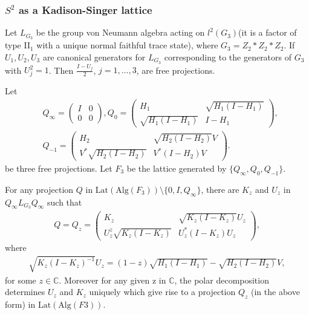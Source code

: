 \documentclass{beamer}
\newcommand{\Lat}{\mathrm{Lat}}
\newcommand{\Alg}{\mathrm{Alg}}
\newcommand{\C}{\mathbb C }
\begin{document}
\begin{frame}
\frametitle{$S^{2}$ as a Kadison-Singer lattice}

Let $L_{G_3}$ be the group von Neumann algebra acting on $l^2(G_3)$(it is
a factor of type II$_1$ with a unique normal faithful trace state),
where $G_3 = Z_2 * Z_2 * Z_2$. If $U_1, U_2, U_3$ are canonical generators
for $L_{G_3}$ corresponding to the generators of $G_3$ with $U_{j}^{2} = 1$.
Then $\frac{I-U_j}{2}$, $j = 1, \ldots, 3$, are free projections.

Let 
\begin{align*}
&Q_{\infty} = \begin{pmatrix}
I & 0\\
0 & 0
\end{pmatrix},
Q_{0} = \begin{pmatrix}
H_1 & \sqrt{H_1(I - H_1)}\\
\sqrt{H_1(I - H_1)} & I - H_1
\end{pmatrix},\\
&Q_{-1} = \begin{pmatrix}
H_2 & \sqrt{H_2(I-H_2)}V\\
V^{*}\sqrt{H_2(I-H_2)} & V^*(I-H_2)V
\end{pmatrix}.
\end{align*}
be three free projections. Let $F_3$ be the lattice generated by $\{Q_{\infty},
Q_{0}, Q_{-1} \}$.
\end{frame}

\begin{frame}

\begin{theorem}
For any projection $Q$ in $\Lat(\Alg(F_3)) \setminus \{0, I, Q_{\infty} \}$,
there are $K_z$ and $U_z$ in $Q_{\infty}L_{G_3}Q_{\infty}$ such that
\begin{align*}
Q = Q_{z} = \begin{pmatrix}
K_z & \sqrt{K_z(I - K_z)}U_z \\
U^{z}_{z}\sqrt{K_z(I-K_z)} & U^{*}_z(I - K_z)U_z
\end{pmatrix},
\end{align*}
where
\begin{align*}
\sqrt{K_z(I - K_z)^{-1}}U_z = (1-z)\sqrt{H_1(I - H_1)} - \sqrt{H_2(I - H_2)}V,
\end{align*}
for some $z \in \C$. Moreover for any given z in $\C$, the polar
decomposition determines $U_z$ and $K_z$ uniquely which give rise to a
projection $Q_z$ (in the above form) in $\Lat(\Alg (F3))$.
\end{theorem}

\end{frame}
\end{document}
